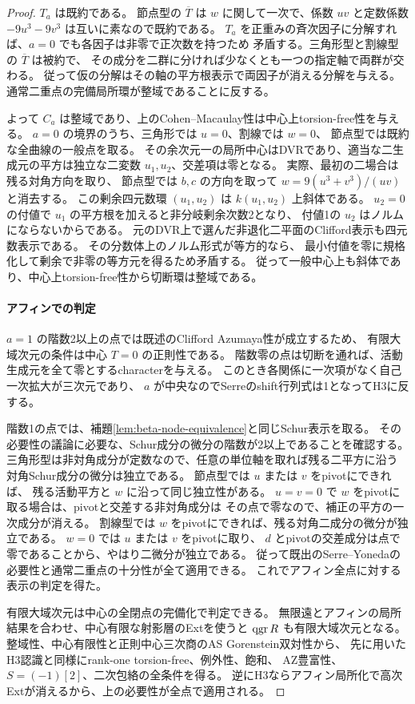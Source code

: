 \begin{proof}
$T_a$ は既約である。
節点型の $\overline T$ は $w$ に関して一次で、係数 $uv$ と定数係数
$-9u^3-9v^3$ は互いに素なので既約である。
$T_a$ を正重みの斉次因子に分解すれば、$a=0$ でも各因子は非零で正次数を持つため
矛盾する。三角形型と割線型の $\overline T$ は被約で、
その成分を二群に分ければ少なくとも一つの指定軸で両群が交わる。
従って仮の分解はその軸の平方根表示で両因子が消える分解を与える。
通常二重点の完備局所環が整域であることに反する。

よって $C_a$ は整域であり、上のCohen--Macaulay性は中心上torsion-free性を与える。
$a=0$ の境界のうち、三角形では $u=0$、割線では $w=0$、
節点型では既約な全曲線の一般点を取る。
その余次元一の局所中心はDVRであり、適当な二生成元の平方は独立な二変数
$u_1,u_2$、交差項は零となる。
実際、最初の二場合は残る対角方向を取り、
節点型では $b,c$ の方向を取って
$w=9(u^3+v^3)/(uv)$ と消去する。
この剰余四元数環 $(u_1,u_2)$ は $k(u_1,u_2)$ 上斜体である。
$u_2=0$ の付値で $u_1$ の平方根を加えると非分岐剰余次数2となり、
付値1の $u_2$ はノルムにならないからである。
元のDVR上で選んだ非退化二平面のClifford表示も四元数表示である。
その分数体上のノルム形式が等方的なら、
最小付値を零に規格化して剰余で非零の等方元を得るため矛盾する。
従って一般中心上も斜体であり、中心上torsion-free性から切断環は整域である。

\paragraph{アフィンでの判定}
$a=1$ の階数2以上の点では既述のClifford Azumaya性が成立するため、
有限大域次元の条件は中心 $T=0$ の正則性である。
階数零の点は切断を通れば、活動生成元を全て零とするcharacterを与える。
このとき各関係に一次項がなく自己一次拡大が三次元であり、
$a$ が中央なのでSerreのshift行列式は1となってH3に反する。

階数1の点では、補題\ref{lem:beta-node-equivalence}と同じSchur表示を取る。
その必要性の議論に必要な、Schur成分の微分の階数が2以上であることを確認する。
三角形型は非対角成分が定数なので、任意の単位軸を取れば残る二平方に沿う
対角Schur成分の微分は独立である。
節点型では $u$ または $v$ をpivotにできれば、
残る活動平方と $w$ に沿って同じ独立性がある。
$u=v=0$ で $w$ をpivotに取る場合は、pivotと交差する非対角成分は
その点で零なので、補正の平方の一次成分が消える。
割線型では $w$ をpivotにできれば、残る対角二成分の微分が独立である。
$w=0$ では $u$ または $v$ をpivotに取り、
$d$ とpivotの交差成分は点で零であることから、やはり二微分が独立である。
従って既出のSerre--Yonedaの必要性と通常二重点の十分性が全て適用できる。
これでアフィン全点に対する表示の判定を得た。

有限大域次元は中心の全閉点の完備化で判定できる。
無限遠とアフィンの局所結果を合わせ、中心有限な射影層のExtを使うと
$\operatorname{qgr} R$ も有限大域次元となる。
整域性、中心有限性と正則中心三次商のAS Gorenstein双対性から、
先に用いたH3認識と同様にrank-one torsion-free、例外性、飽和、
AZ豊富性、$S=(-1)[2]$、二次包絡の全条件を得る。
逆にH3ならアフィン局所化で高次Extが消えるから、上の必要性が全点で適用される。
\end{proof}

